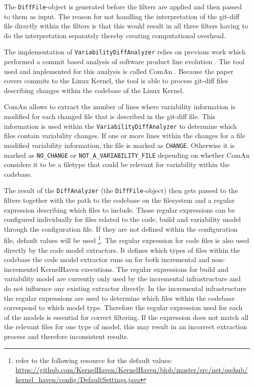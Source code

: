 \documentclass[a4paper]{article}
\begin{document}
The \texttt{DiffFile}-object is generated before the filters are applied and then passed to them as input. The reason for not handling the interpretation of the git-diff file directly within the filters is that this would result in all three filters having to do the interpretation separately thereby creating computational overhead.

The implementation of \texttt{Variability\-Diff\-Analyzer} relies on previous work which performed a commit based analysis of software product line evolution \cite{ComAn}. The tool used and implemented for this analysis  is called ComAn \cite{ComAn-tool}. Because the paper covers commits to the Linux Kernel, the tool is able to process git-diff files describing changes within the codebase of the Linux Kernel. 

ComAn allows to extract the number of lines where variability information is modified for each changed file that is described in the git-diff file. This information is used within the \texttt{Variability\-Diff\-Analyzer} to determine which files contain variability changes. If one or more lines within the changes for a file modified variability information, the file is marked as \texttt{CHANGE}. Otherwise it is marked as \texttt{NO\_CHANGE} or \texttt{NOT\_A\_VARIABILITY\_FILE} depending on whether ComAn considers it to be a filetype that could be relevant for variability within the codebase. 

The result of the \texttt{DiffAnalyzer} (the \texttt{DiffFile}-object) then gets passed to the filters together with the path to the codebase on the filesystem and a regular expression describing which files to include. Those regular expressions can be configured individually for files related to the code, build and variability model through the configuration file. If they are not defined within the configuration file, default values will be used \footnote{refer to the following resource  for the default values: \url{https://github.com/KernelHaven/KernelHaven/blob/master/src/net/ssehub/kernel_haven/config/DefaultSettings.java}}. The regular expression for code files is also used directly by the code model extractors. It defines which types of files within the codebase the code model extractor runs on for both incremental and non-incrementel KernelHaven executions. The regular expressions for build and variability model are currently only used by the incremental infrastructure and do not influence any existing extractor directly. In the incremental infrastructure the regular expressions are used to determine which files within the codebase correspond to which model type. Therefore the regular expression used for each of the models is essential for correct filtering. If the expression does not match all the relevant files for one type of model, this may result in an incorrect extraction process and therefore inconsistent results.
\end{document}
